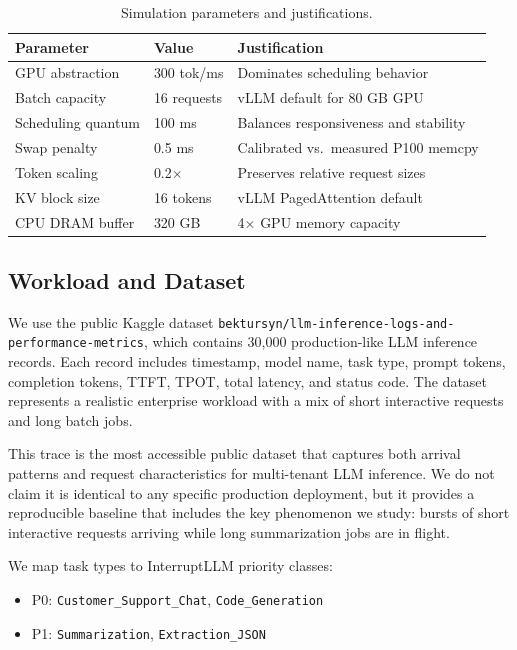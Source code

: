 \documentclass[conference]{IEEEtran}
\begin{document}
\begin{table}[t]
\caption{Simulation parameters and justifications.}
\label{tab:assumptions}
\centering
\footnotesize
\setlength{\tabcolsep}{3pt}
\begin{tabular}{@{}lll@{}}
\toprule
\textbf{Parameter} & \textbf{Value} & \textbf{Justification} \\
\midrule
GPU abstraction & 300 tok/ms & Dominates scheduling behavior \\
Batch capacity & 16 requests & vLLM default for 80 GB GPU \\
Scheduling quantum & 100 ms & Balances responsiveness and stability \\
Swap penalty & 0.5 ms & Calibrated vs.\ measured P100 memcpy \\
Token scaling & 0.2$\times$ & Preserves relative request sizes \\
KV block size & 16 tokens & vLLM PagedAttention default \\
CPU DRAM buffer & 320 GB & 4$\times$ GPU memory capacity \\
\bottomrule
\end{tabular}
\end{table}

\subsection{Workload and Dataset}

We use the public Kaggle dataset \texttt{bektursyn/llm-inference-logs-and-performance-metrics}\cite{kaggle2024llmtrace}, which contains 30,000 production-like LLM inference records. Each record includes timestamp, model name, task type, prompt tokens, completion tokens, TTFT, TPOT, total latency, and status code. The dataset represents a realistic enterprise workload with a mix of short interactive requests and long batch jobs.

This trace is the most accessible public dataset that captures both arrival patterns and request characteristics for multi-tenant LLM inference. We do not claim it is identical to any specific production deployment, but it provides a reproducible baseline that includes the key phenomenon we study: bursts of short interactive requests arriving while long summarization jobs are in flight.

We map task types to InterruptLLM priority classes:
\begin{itemize}
    \item P0: \texttt{Customer\_Support\_Chat}, \texttt{Code\_Generation}
    \item P1: \texttt{Summarization}, \texttt{Extraction\_JSON}
\end{itemize}
\end{document}
